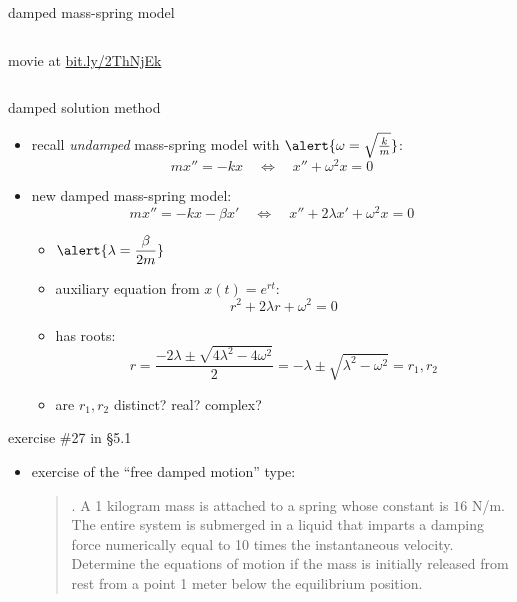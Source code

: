 \documentclass[urlcolor=blue,dvipsnames]{beamer}
\begin{document}
\begin{frame}{damped mass-spring model}
\begin{columns}
\begin{column}{0.3\textwidth}
\scriptsize movie at \href{https://bit.ly/2ThNjEk}{bit.ly/2ThNjEk}
\end{column}
\end{columns}
\end{frame}


\begin{frame}{damped solution method}

\begin{itemize}
\item recall \emph{undamped} mass-spring model with $\alert{\omega = \sqrt{\frac{k}{m}}}$:
    $$m x'' = - k x \quad \iff \quad x'' + \omega^2 x = 0$$
\item new damped mass-spring model:
    $$m x'' = - k x - \beta x' \quad \iff \quad x'' + 2 \lambda x' + \omega^2 x = 0$$

\vspace{-2mm}
    \begin{itemize}
    \item $\displaystyle \alert{\lambda = \frac{\beta}{2m}}$

\vspace{1mm}
    \item auxiliary equation from $x(t)=e^{rt}$:
        $$r^2 + 2\lambda r + \omega^2=0$$

\vspace{-2mm}
    \item has roots:
        $$r = \frac{-2\lambda \pm \sqrt{4 \lambda^2 - 4 \omega^2}}{2} = -\lambda \pm \sqrt{\lambda^2 - \omega^2}=r_1,r_2$$

\vspace{-2mm}
    \item are $r_1,r_2$ distinct? real? complex?
    \end{itemize}
\end{itemize}
\end{frame}


\begin{frame}{exercise \#27 in \S5.1}

\begin{itemize}
\item exercise of the ``free damped motion'' type:

\begin{quotation}
. A 1 kilogram mass is attached to a spring whose constant is $16$ N/m.  The entire system is submerged in a liquid that imparts a damping force numerically equal to 10 times the instantaneous velocity.  Determine the equations of motion if the mass is initially released from rest from a point 1 meter below the equilibrium position.\end{quotation}
\end{itemize}

\vspace{40mm}
\end{frame}
\end{document}
